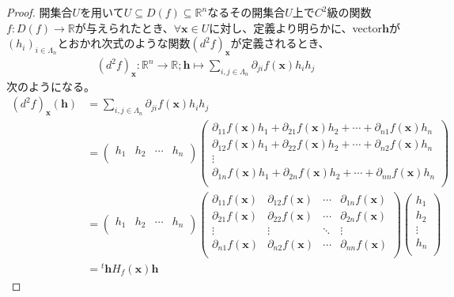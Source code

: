 \documentclass[dvipdfmx]{jsarticle}
\begin{document}
\begin{proof}
開集合$U$を用いて$U \subseteq D(f) \subseteq \mathbb{R}^{n}$なるその開集合$U$上で$C^{2}$級の関数$f:D(f) \rightarrow \mathbb{R}$が与えられたとき、$\forall\mathbf{x} \in U$に対し、定義より明らかに、vector$\mathbf{h}$が$\left( h_{i} \right)_{i \in \varLambda_{n}}$とおかれ次式のような関数$\left( d^{2}f \right)_{\mathbf{x}}$が定義されるとき、
\begin{align*}
\left( d^{2}f \right)_{\mathbf{x}}:\mathbb{R}^{n} \rightarrow \mathbb{R};\mathbf{h} \mapsto \sum_{i,j \in \varLambda_{n}} {\partial_{ji}f\left( \mathbf{x} \right)h_{i}h_{j}}
\end{align*}
次のようになる。
\begin{align*}
\left( d^{2}f \right)_{\mathbf{x}}\left( \mathbf{h} \right) &= \sum_{i,j \in \varLambda_{n}} {\partial_{ji}f\left( \mathbf{x} \right)h_{i}h_{j}}\\
&= \begin{pmatrix}
h_{1} & h_{2} & \cdots & h_{n} \\
\end{pmatrix}\begin{pmatrix}
\partial_{11}f\left( \mathbf{x} \right)h_{1} + \partial_{21}f\left( \mathbf{x} \right)h_{2} + \cdots + \partial_{n1}f\left( \mathbf{x} \right)h_{n} \\
\partial_{12}f\left( \mathbf{x} \right)h_{1} + \partial_{22}f\left( \mathbf{x} \right)h_{2} + \cdots + \partial_{n2}f\left( \mathbf{x} \right)h_{n} \\
 \vdots \\
\partial_{1n}f\left( \mathbf{x} \right)h_{1} + \partial_{2n}f\left( \mathbf{x} \right)h_{2} + \cdots + \partial_{nn}f\left( \mathbf{x} \right)h_{n} \\
\end{pmatrix}\\
&= \begin{pmatrix}
h_{1} & h_{2} & \cdots & h_{n} \\
\end{pmatrix}\begin{pmatrix}
\partial_{11}f\left( \mathbf{x} \right) & \partial_{12}f\left( \mathbf{x} \right) & \cdots & \partial_{1n}f\left( \mathbf{x} \right) \\
\partial_{21}f\left( \mathbf{x} \right) & \partial_{22}f\left( \mathbf{x} \right) & \cdots & \partial_{2n}f\left( \mathbf{x} \right) \\
 \vdots & \vdots & \ddots & \vdots \\
\partial_{n1}f\left( \mathbf{x} \right) & \partial_{n2}f\left( \mathbf{x} \right) & \cdots & \partial_{nn}f\left( \mathbf{x} \right) \\
\end{pmatrix}\begin{pmatrix}
h_{1} \\
h_{2} \\
 \vdots \\
h_{n} \\
\end{pmatrix}\\
&={}^{t}\mathbf{h}H_{f}\left( \mathbf{x} \right)\mathbf{h}
\end{align*}
\end{proof}
\end{document}
